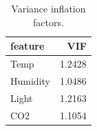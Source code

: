 \begin{table}
\caption{Variance inflation factors.}
\label{tab:vif}
\begin{tabular}{lr}
\toprule
feature & VIF \\
\midrule
Temp & 1.2428 \\
Humidity & 1.0486 \\
Light & 1.2163 \\
CO2 & 1.1054 \\
\bottomrule
\end{tabular}
\end{table}
